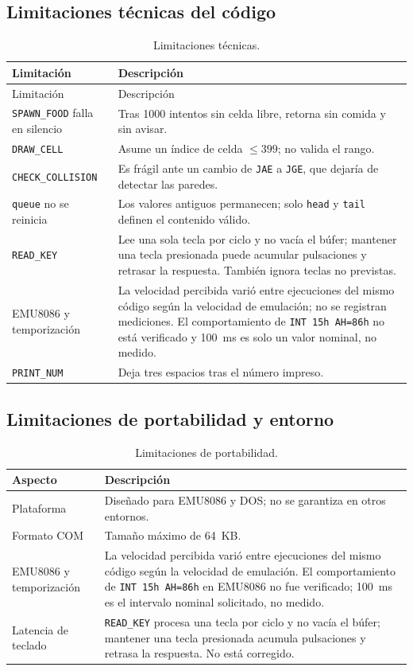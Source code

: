\documentclass[10pt]{article}
\begin{document}
\subsection{Limitaciones técnicas del código}
\begin{longtable}{@{}p{4.2cm}p{9.2cm}@{}}
\caption{Limitaciones técnicas.}\label{tab:limtec}\\
\toprule
Limitación & Descripción \\
\midrule
\endfirsthead
\toprule
Limitación & Descripción \\
\midrule
\endhead
\bottomrule
\endfoot
\texttt{SPAWN\_FOOD} falla en silencio & Tras 1000 intentos sin celda libre, retorna sin comida y sin avisar. \\
\texttt{DRAW\_CELL} & Asume un índice de celda $\leq 399$; no valida el rango. \\
\texttt{CHECK\_COLLISION} & Es frágil ante un cambio de \texttt{JAE} a \texttt{JGE}, que dejaría de detectar las paredes. \\
\texttt{queue} no se reinicia & Los valores antiguos permanecen; solo \texttt{head} y \texttt{tail} definen el contenido válido. \\
\texttt{READ\_KEY} & Lee una sola tecla por ciclo y no vacía el búfer; mantener una tecla presionada puede acumular pulsaciones y retrasar la respuesta. También ignora teclas no previstas. \\
EMU8086 y temporización & La velocidad percibida varió entre ejecuciones del mismo código según la velocidad de emulación; no se registran mediciones. El comportamiento de \texttt{INT 15h AH=86h} no está verificado y 100~ms es solo un valor nominal, no medido. \\
\texttt{PRINT\_NUM} & Deja tres espacios tras el número impreso. \\
\end{longtable}

\subsection{Limitaciones de portabilidad y entorno}
\begin{table}[ht]
\centering
\caption{Limitaciones de portabilidad.}
\label{tab:portabilidad}
\begin{tabular}{@{}p{4.2cm}p{9.2cm}@{}}
\toprule
Aspecto & Descripción \\
\midrule
Plataforma & Diseñado para EMU8086 y DOS; no se garantiza en otros entornos. \\
Formato COM & Tamaño máximo de 64~KB. \\
EMU8086 y temporización & La velocidad percibida varió entre ejecuciones del mismo código según la velocidad de emulación. El comportamiento de \texttt{INT 15h AH=86h} en EMU8086 no fue verificado; 100~ms es el intervalo nominal solicitado, no medido. \\
Latencia de teclado & \texttt{READ\_KEY} procesa una tecla por ciclo y no vacía el búfer; mantener una tecla presionada acumula pulsaciones y retrasa la respuesta. No está corregido. \\
\bottomrule
\end{tabular}
\end{table}
\end{document}
